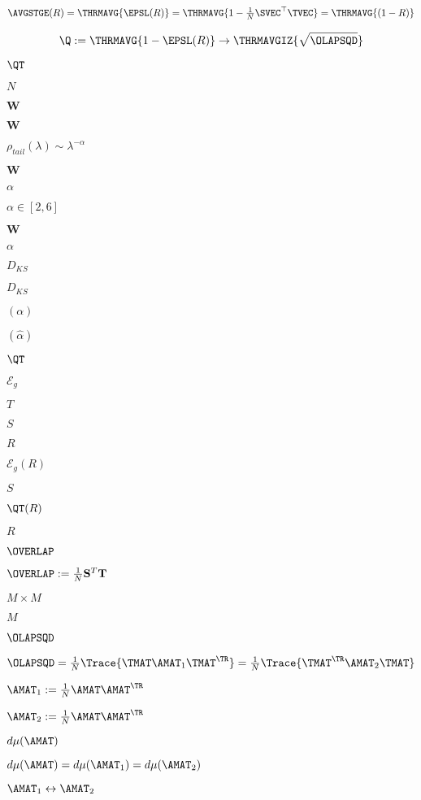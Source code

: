 \begin{align}
\label{eqn:AVGSTGE_R}
\AVGSTGE(R)=\THRMAVG{\EPSL(R)}=\THRMAVG{1-\tfrac{1}{N}\SVEC^{\top}\TVEC}=\THRMAVG{(1-R)} 
\end{align}

\begin{align}
\label{eqn:QT_0}
\Q:=\THRMAVG{1-\EPSL(R)}\rightarrow\THRMAVGIZ{\sqrt{\OLAPSQD}}
\end{align}


$\QT$

$N$


$\mathbf{W}$

$\mathbf{W}$

$\rho_{tail}(\lambda)\sim\lambda^{-\alpha}$

$\mathbf{W}$

$\alpha$

$\alpha\in[2,6]$

$\mathbf{W}$

$\alpha$

$D_{KS}$

$D_{KS}$

$(\alpha)$

$(\hat{\alpha})$

$\QT$

$\mathcal{E}_g$

$T$

$S$

$R$

$\mathcal{E}_{g}(R)$

$S$

$\QT(R)$

$R$

$\OVERLAP$

$\OVERLAP := \tfrac{1}{N}\mathbf{S}^{T}\mathbf{T}$

$M \times M$

$M$

$\OLAPSQD$

$\OLAPSQD=\tfrac{1}{N}\Trace{\TMAT\AMAT_{1}\TMAT^{\TR}}=\tfrac{1}{N}\Trace{\TMAT^{\TR}\AMAT_{2}\TMAT}$

$\AMAT_{1}:=\tfrac{1}{N}\AMAT\AMAT^{\TR}$

$\AMAT_{2}:=\tfrac{1}{N}\AMAT\AMAT^{\TR}$

$d\mu(\AMAT)$

$d\mu(\AMAT)=d\mu(\AMAT_1)=d\mu(\AMAT_2)$

$\AMAT_{1}\leftrightarrow\AMAT_{2}$

